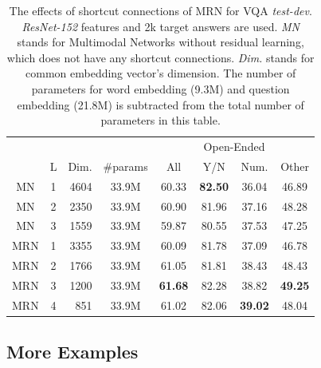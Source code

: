\begin{table}[h]
\caption{The effects of shortcut connections of MRN for VQA \textit{test-dev}. \textit{ResNet-152} features and 2k target answers are used. \textit{MN} stands for Multimodal Networks without residual learning, which does not have any shortcut connections. \textit{Dim.} stands for common embedding vector's dimension. The number of parameters for word embedding (9.3M) and question embedding (21.8M) is subtracted from the total number of parameters in this table.}
\label{tab:mn}
\centering
\begin{tabular}{ccrccccc}
\toprule
& & & & \multicolumn{4}{c}{Open-Ended} \\
\cmidrule{5-8}
 & L & Dim. & \#params & All & Y/N & Num. & Other \\
\midrule
  MN & 1 & 4604 & 33.9M & 
     60.33 & \textbf{82.50} & 36.04 & 46.89 \\
  MN & 2 & 2350 & 33.9M & 
     60.90 & 81.96 & 37.16 & 48.28 \\
  MN & 3 & 1559 & 33.9M & 
     59.87 & 80.55 & 37.53 & 47.25 \\
\midrule
  MRN & 1 & 3355 & 33.9M & 
     60.09 & 81.78 & 37.09 & 46.78 \\
  MRN & 2 & 1766 & 33.9M & 
     61.05 & 81.81 & 38.43 & 48.43 \\
  MRN & 3 & 1200 & 33.9M & 
     \textbf{61.68} & 82.28 & 38.82 & \textbf{49.25} \\
  MRN & 4 & 851 & 33.9M & 
     61.02 & 82.06 & \textbf{39.02} & 48.04 \\
\bottomrule
\end{tabular}
\end{table}

\newpage
\subsection{More Examples}

